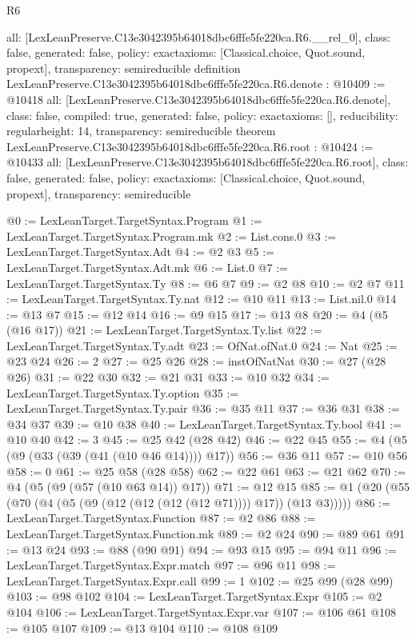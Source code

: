 \begin{lexlean}{R6}
\begin{coremodule}
{  all: [LexLeanPreserve.C13e3042395b64018dbc6fffe5fe220ca.R6.__rel_0],
  class: false,
  generated: false,
  policy: exact{axioms: [Classical.choice, Quot.sound, propext]},
  transparency: semireducible
}
definition LexLeanPreserve.C13e3042395b64018dbc6fffe5fe220ca.R6.denote : @10409 := @10418 {
  all: [LexLeanPreserve.C13e3042395b64018dbc6fffe5fe220ca.R6.denote],
  class: false,
  compiled: true,
  generated: false,
  policy: exact{axioms: []},
  reducibility: regular{height: 14},
  transparency: semireducible
}
theorem LexLeanPreserve.C13e3042395b64018dbc6fffe5fe220ca.R6.root : @10424 := @10433 {
  all: [LexLeanPreserve.C13e3042395b64018dbc6fffe5fe220ca.R6.root],
  class: false,
  generated: false,
  policy: exact{axioms: [Classical.choice, Quot.sound, propext]},
  transparency: semireducible
}

@0 := LexLeanTarget.TargetSyntax.Program
@1 := LexLeanTarget.TargetSyntax.Program.mk
@2 := List.cons.{0}
@3 := LexLeanTarget.TargetSyntax.Adt
@4 := @2 @3
@5 := LexLeanTarget.TargetSyntax.Adt.mk
@6 := List.{0}
@7 := LexLeanTarget.TargetSyntax.Ty
@8 := @6 @7
@9 := @2 @8
@10 := @2 @7
@11 := LexLeanTarget.TargetSyntax.Ty.nat
@12 := @10 @11
@13 := List.nil.{0}
@14 := @13 @7
@15 := @12 @14
@16 := @9 @15
@17 := @13 @8
@20 := @4 (@5 (@16 @17))
@21 := LexLeanTarget.TargetSyntax.Ty.list
@22 := LexLeanTarget.TargetSyntax.Ty.adt
@23 := OfNat.ofNat.{0}
@24 := Nat
@25 := @23 @24
@26 := 2
@27 := @25 @26
@28 := instOfNatNat
@30 := @27 (@28 @26)
@31 := @22 @30
@32 := @21 @31
@33 := @10 @32
@34 := LexLeanTarget.TargetSyntax.Ty.option
@35 := LexLeanTarget.TargetSyntax.Ty.pair
@36 := @35 @11
@37 := @36 @31
@38 := @34 @37
@39 := @10 @38
@40 := LexLeanTarget.TargetSyntax.Ty.bool
@41 := @10 @40
@42 := 3
@45 := @25 @42 (@28 @42)
@46 := @22 @45
@55 := @4 (@5 (@9 (@33 (@39 (@41 (@10 @46 @14)))) @17))
@56 := @36 @11
@57 := @10 @56
@58 := 0
@61 := @25 @58 (@28 @58)
@62 := @22 @61
@63 := @21 @62
@70 := @4 (@5 (@9 (@57 (@10 @63 @14)) @17))
@71 := @12 @15
@85 := @1 (@20 (@55 (@70 (@4 (@5 (@9 (@12 (@12 (@12 (@12 @71)))) @17)) (@13 @3)))))
@86 := LexLeanTarget.TargetSyntax.Function
@87 := @2 @86
@88 := LexLeanTarget.TargetSyntax.Function.mk
@89 := @2 @24
@90 := @89 @61
@91 := @13 @24
@93 := @88 (@90 @91)
@94 := @93 @15
@95 := @94 @11
@96 := LexLeanTarget.TargetSyntax.Expr.match
@97 := @96 @11
@98 := LexLeanTarget.TargetSyntax.Expr.call
@99 := 1
@102 := @25 @99 (@28 @99)
@103 := @98 @102
@104 := LexLeanTarget.TargetSyntax.Expr
@105 := @2 @104
@106 := LexLeanTarget.TargetSyntax.Expr.var
@107 := @106 @61
@108 := @105 @107
@109 := @13 @104
@110 := @108 @109

\end{coremodule}
\end{lexlean}
